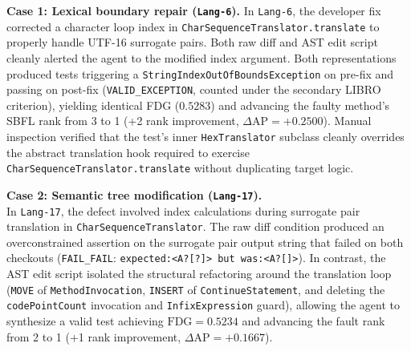 \documentclass[12pt, a4paper]{article}
\begin{document}
\textbf{Case 1: Lexical boundary repair (\texttt{Lang-6}).}
In \texttt{Lang-6}, the developer fix corrected a character loop index in \texttt{CharSequenceTranslator.translate} to properly handle UTF-16 surrogate pairs.
Both raw diff and AST edit script cleanly alerted the agent to the modified index argument.
Both representations produced tests triggering a \texttt{StringIndexOutOfBoundsException} on pre-fix and passing on post-fix (\texttt{VALID\_EXCEPTION}, counted under the secondary LIBRO criterion), yielding identical FDG ($0.5283$) and advancing the faulty method's SBFL rank from 3 to 1 (+2 rank improvement, $\Delta\text{AP} = +0.2500$).
Manual inspection verified that the test's inner \texttt{HexTranslator} subclass cleanly overrides the abstract translation hook required to exercise \texttt{CharSequenceTranslator.translate} without duplicating target logic.

\textbf{Case 2: Semantic tree modification (\texttt{Lang-17}).}\\
In \texttt{Lang-17}, the defect involved index calculations during surrogate pair translation in \texttt{CharSequenceTranslator}.
The raw diff condition produced an overconstrained assertion on the surrogate pair output string that failed on both checkouts (\texttt{FAIL\_FAIL}: \texttt{expected:<A?[?]> but was:<A?[]>}).
In contrast, the AST edit script isolated the structural refactoring around the translation loop (\texttt{MOVE} of \texttt{MethodInvocation}, \texttt{INSERT} of \texttt{ContinueStatement}, and deleting the \texttt{codePointCount} invocation and \texttt{InfixExpression} guard), allowing the agent to synthesize a valid test achieving $\text{FDG} = 0.5234$ and advancing the fault rank from 2 to 1 (+1 rank improvement, $\Delta\text{AP} = +0.1667$).
\end{document}
